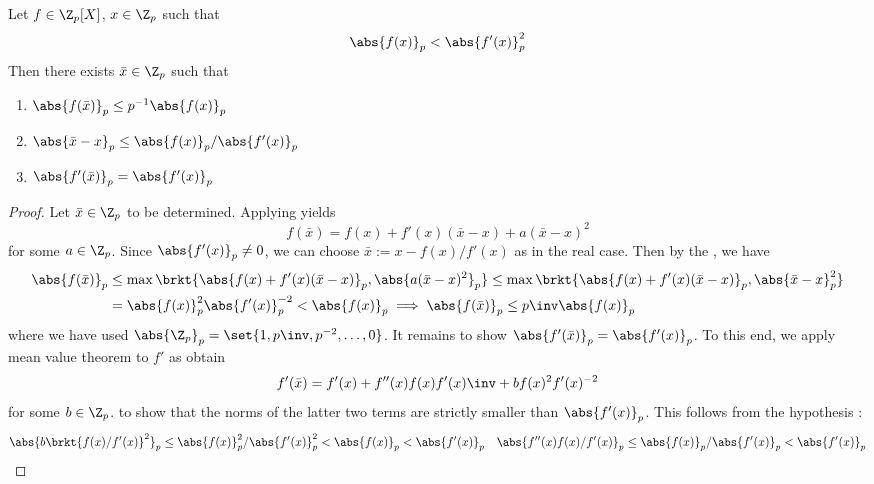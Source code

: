 \begin{prop}
  
  Let $f \in \Z_p[X]$, $x \in \Z_p$ such that 
  \[
    \abs{f(x)}_p < \abs{f'(x)}_p^2
  \]
  Then there exists $\bar{x} \in \Z_p$ such that 
  \begin{enumerate}
    \item $\abs{f(\bar{x})}_p \leq p^{-1}\abs{f(x)}_p$
    \item $\abs{\bar{x} - x}_p \leq {\abs{f(x)}_p}/{\abs{f'(x)}_p}$
    \item $\abs{f'(\bar{x})}_p = \abs{f'(x)}_p$
  \end{enumerate}
\end{prop}
\begin{proof}
  Let $\bar{x} \in \Z_p$ to be determined. 
  Applying  yields \[
    f(\bar{x}) 
    = f(x) + f'(x)(\bar{x} - x) + a (\bar{x} - x)^2
  \]
  for some $a \in \Z_p$. 
  Since $\abs{f'(x)}_p \neq 0$, 
  we can choose $\bar{x} := x - f(x) / f'(x)$ as in the real case.
  Then by the ,
  we have \begin{align*}
    \abs{f(\bar{x})}_p 
    &\leq \max\brkt{\abs{f(x) + f'(x)(\bar{x} - x)}_p, \abs{a (\bar{x} - x)^2}_p}
    \leq \max\brkt{\abs{f(x) + f'(x)(\bar{x} - x)}_p, \abs{\bar{x} - x}_p^2} \\
    &= \abs{f(x)}_p^2 \abs{f'(x)}_p^{-2} < \abs{f(x)}_p 
    \implies \abs{f(\bar{x})}_p \leq p\inv \abs{f(x)}_p
  \end{align*}
  where we have used $\abs{\Z_p}_p = \set{1, p\inv, p^{-2}, \dots, 0}$.
  It remains to show $\abs{f'(\bar{x})}_p = \abs{f'(x)}_p$.
  To this end, we apply mean value theorem to $f'$ as obtain \[
    f'(\bar{x})
    = f'(x) + f''(x) f(x) {f'(x)}\inv 
    + b f(x)^2 f'(x)^{-2}
  \]
  for some $b \in \Z_p$. 
   to show that 
  the norms of the latter two terms are strictly smaller than $\abs{f'(x)}_p$.
  This follows from the hypothesis : \begin{align*}
    \abs{b \brkt{{f(x)}/{f'(x)}}^2}_p 
    \leq {\abs{f(x)}_p^2}/{\abs{f'(x)}_p^2} 
    < \abs{f(x)}_p < \abs{f'(x)}_p &&
    \abs{f''(x) {f(x)}/{f'(x)}}_p 
    \leq {\abs{f(x)}_p}/{\abs{f'(x)}_p}
    < \abs{f'(x)}_p
  \end{align*}

\end{proof}

